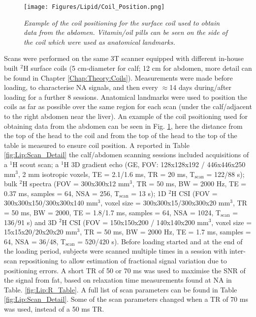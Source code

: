 \begin{figure}
    \centering
    \texttt{[image: Figures/Lipid/Coil\_Position.png]}
    \caption{\textit{Example of the coil positioning for the surface coil used to obtain data from the abdomen. Vitamin/oil pills can be seen on the side of the coil which were used as anatomical landmarks.}}
    \label{fig:Lip:Coil_Photo}
\end{figure}

Scans were performed on the same 3T scanner equipped with different in-house built $^2$H surface coils (5 cm-diameter for calf; 12 cm for abdomen, more detail can be found in Chapter \ref{Chap:Theory:Coils}). Measurements were made before loading, to characterise \ac{NA} signals, and then every $\approx$14 days during/after loading for a further 8 sessions. Anatomical landmarks were used to position the coils as far as possible over the same region for each scan (under the calf/adjacent to the right abdomen near the liver). An example of the coil psoitioning used for obtaining data from the abdomen can be seen in Fig. \ref{fig:Lip:Coil_Photo}, here the distance from the top of the head to the coil and from the top of the head to the top of the table is measured to ensure coil position. A reported in Table \ref{fig:Lip:Scan_Detail} the calf/abdomen scanning sessions included acquisitions of a $^1$H scout scan; a $^1$H 3D gradient echo (\ac{GE}, \ac{FOV}: 128x128x192 / 446x446x250 mm$^3$, 2 mm isotropic voxels, \ac{TE} = 2.1/1.6 ms, TR = 20 ms, T$_\text{scan}$ = 122/88 s); bulk $^2$H spectra (\ac{FOV} = 300x300x12 mm$^3$, \ac{TR} = 50 ms, \ac{BW} = 2000 Hz, \ac{TE} = 0.37 ms, samples = 64, NSA = 256, T$_\text{scan}$ = 13 s); 1D $^2$H \ac{CSI} (\ac{FOV} = 300x300x150/300x300x140 mm$^3$, voxel size = 300x300x15/300x300x20 mm$^3$, \ac{TR} = 50 ms, \ac{BW} = 2000, \ac{TE} = 1.8/1.7 ms, samples = 64, NSA = 1024, T$_\text{scan}$ = 136/91 s) and 3D $^2$H \ac{CSI} (\ac{FOV} = 150x150x200 / 140x140x200 mm$^3$, voxel size = 15x15x20/20x20x20 mm$^3$, TR = 50 ms, \ac{BW} = 2000 Hz, \ac{TE} = 1.7 ms, samples = 64, NSA = 36/48, T$_\text{scan}$ = 520/420 s). Before loading started and at the end of the loading period, subjects were scanned multiple times in a session with inter-scan repositioning to allow estimation of fractional signal variation due to positioning errors. A short \ac{TR} of 50 or 70 ms was used to maximise the \ac{SNR} of the signal from fat, based on relaxation time measurements found at \ac{NA} in Table. \ref{fig:Lip:R_Table}. A full list of scan parameters can be found in Table \ref{fig:Lip:Scan_Detail}. Some of the scan parameters changed when a \ac{TR} of 70 ms was used, instead of a 50 ms \ac{TR}. 

